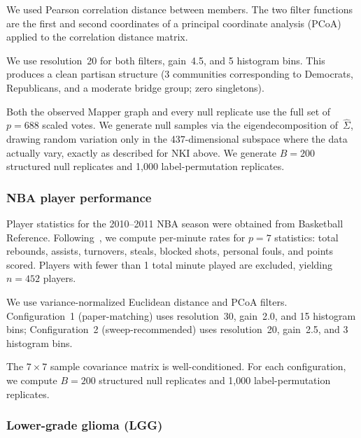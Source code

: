 \documentclass[hidelinks]{siamart251216}
\begin{document}
We used Pearson correlation distance between members.  The two filter
functions are the first and second coordinates of a principal coordinate
analysis (PCoA) applied to the correlation distance matrix.

We use resolution~20 for both filters, gain~4.5, and 5 histogram bins.
This produces a clean partisan structure (3 communities corresponding to
Democrats, Republicans, and a moderate bridge group; zero singletons).

Both the observed Mapper graph and every null replicate use the full set
of $p = 688$ scaled votes.  We generate null samples via the
eigendecomposition of~$\hat{\Sigma}$, drawing random variation only in
the 437-dimensional subspace where the data actually vary, exactly as
described for NKI above.  We generate $B = 200$ structured null
replicates and 1,000 label-permutation replicates.

\subsubsection*{NBA player performance}

Player statistics for the 2010--2011 NBA season were obtained from
Basketball Reference.  Following~\cite{Lum2013}, we compute per-minute
rates for $p = 7$ statistics: total rebounds, assists, turnovers, steals,
blocked shots, personal fouls, and points scored.  Players with fewer
than 1 total minute played are excluded, yielding $n = 452$ players.

We use variance-normalized Euclidean distance and PCoA filters.
Configuration~1 (paper-matching) uses resolution~30, gain~2.0, and 15
histogram bins; Configuration~2 (sweep-recommended) uses resolution~20,
gain~2.5, and 3 histogram bins.

The $7 \times 7$ sample covariance matrix is well-conditioned.  For each
configuration, we compute $B = 200$ structured null replicates and 1,000
label-permutation replicates.

\subsubsection*{Lower-grade glioma (LGG)}
\end{document}
